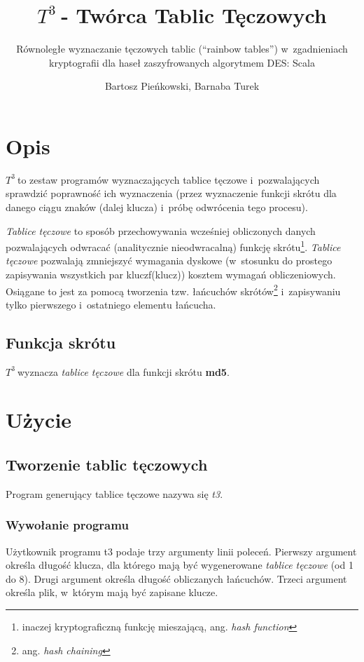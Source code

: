 \documentclass[a4paper]{scrartcl}
\begin{document}
\sloppy

\newcommand{\ttt}{$T^3\:$}

\title{\ttt - Twórca Tablic Tęczowych}
\subtitle{Równoległe wyznaczanie tęczowych tablic (``rainbow tables'') w~zgadnieniach kryptografii dla haseł zaszyfrowanych algorytmem DES: Scala}
\author{Bartosz Pieńkowski, Barnaba Turek}
\maketitle
\section{Opis}
\ttt to zestaw programów wyznaczających tablice tęczowe i~pozwalających sprawdzić poprawność ich wyznaczenia (przez wyznaczenie funkcji skrótu dla danego ciągu znaków (dalej klucza) i~próbę odwrócenia tego procesu).

\emph{Tablice tęczowe} to sposób przechowywania wcześniej obliczonych danych pozwalających odwracać (analitycznie nieodwracalną) funkcję skrótu\footnote{inaczej kryptograficzną funkcję mieszającą, ang. \emph{hash function}}.
\emph{Tablice tęczowe} pozwalają zmniejszyć wymagania dyskowe (w~stosunku do prostego zapisywania wszystkich par klucz\dywiz f(klucz)) kosztem wymagań obliczeniowych.
Osiągane to jest za pomocą tworzenia tzw. łańcuchów skrótów\footnote{ang. \emph{hash chaining}} i~zapisywaniu tylko pierwszego i~ostatniego elementu łańcucha.

\subsection{Funkcja skrótu}
\ttt wyznacza \emph{tablice tęczowe} dla funkcji skrótu \textbf{md5}.

\section{Użycie}
\subsection{Tworzenie tablic tęczowych}
Program generujący tablice tęczowe nazywa się \emph{t3}.

\subsubsection{Wywołanie programu}
Użytkownik programu t3 podaje trzy argumenty linii poleceń. Pierwszy argument określa długość klucza, dla którego mają być wygenerowane \emph{tablice tęczowe} (od 1 do 8).
Drugi argument określa długość obliczanych łańcuchów.
Trzeci argument określa plik, w~którym mają być zapisane klucze.
\end{document}
